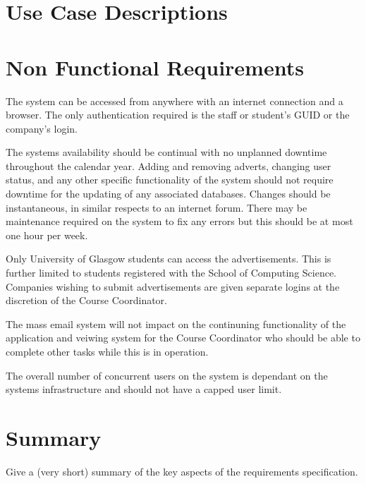 \documentclass{l3deliverable}
\begin{document}
\section{Use Case Descriptions}



\section{Non Functional Requirements}

The system can be accessed from anywhere with an internet connection and a
browser. The only authentication required is the staff or student's GUID or 
the company's login.

The systems availability should be continual with no unplanned downtime
throughout the calendar year. Adding and removing adverts, changing user status,
and any other specific functionality of the system should not require downtime
for the updating of any associated databases. Changes should be instantaneous,
in similar respects to an internet forum. There may be maintenance required on
the system to fix any errors but this should be at most one hour per week.

Only University of Glasgow students can access the advertisements. This is 
further limited to students registered with the School of Computing Science. 
Companies wishing to submit advertisements are given separate logins at the 
discretion of the Course Coordinator.

The mass email system will not impact on the continuning functionality of the 
application and veiwing system for the Course Coordinator who should be able 
to complete other tasks while this is in operation.

The overall number of concurrent users on the system is dependant on the 
systems infrastructure and should not have a capped user limit.



\section{Summary}

Give a (very short) summary of the key aspects of the requirements
specification.

\end{document}
